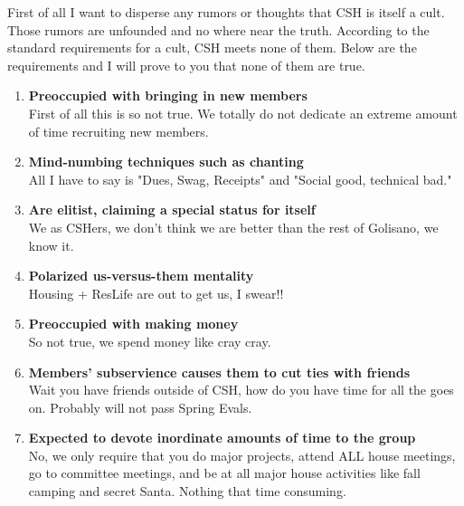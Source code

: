 \documentclass[9pt]{extarticle} %
\begin{document}
%
%
\begin{minipage}[t]{.61\linewidth} %
\vspace{-0.4cm}
\hypertarget{firstnews}{}

First of all I want to disperse any rumors or thoughts that CSH is itself a
cult. Those rumors are unfounded and no where near the truth. According to the
standard requirements for a cult, CSH meets none of them. Below are the 
requirements and I will prove to you that none of them are true. 
\begin{enumerate}
\item \textbf{Preoccupied with bringing in new members} \\ 
First of all this is so not true. We totally do not dedicate an extreme 
amount of time recruiting new members.

\item \textbf{Mind-numbing techniques such as chanting} \\
All I have to say is "Dues, Swag, Receipts" and "Social good, technical bad."

\item \textbf{Are elitist, claiming a special status for itself} \\
We as CSHers, we don't think we are better than the rest of Golisano, we
know it.

\item \textbf{Polarized us-versus-them mentality} \\
Housing + ResLife are out to get us, I swear!!

\item \textbf{Preoccupied with making money} \\
So not true, we spend money like cray cray.

\item \textbf{Members' subservience causes them to cut ties with friends} \\
Wait you have friends outside of CSH, how do you have time for all the goes on.
Probably will not pass Spring Evals. 

\item \textbf{Expected to devote inordinate amounts of time to the group} \\
No, we only require that you do major projects, attend ALL house meetings,
go to committee meetings, and be at all major house activities like fall camping
and secret Santa. Nothing that time consuming.


\end{enumerate}
\end{minipage}
\end{document}
